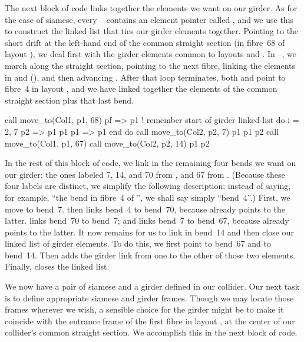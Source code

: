 The next block of code links together the elements we want on our girder. As for the case of siamese, every \PTC\  contains an element pointer called , and we use this to construct the linked list that ties our girder elements together. Pointing  to the short drift at the left-hand end of the common straight section (in fibre~68 of layout ), we deal first with the girder elements common to layouts  and . In --, we march along the straight section, pointing  to the next fibre, linking the elements in  and  (), and then advancing . After that loop terminates, both  and  point to fibre~4 in layout , and we have linked together the elements of the common straight section plus that last bend.
%
\begin{ptccode}
call move_to(Col1, p1, 68)
pf => p1  ! remember start of girder linked-list
do i = 2, 7                 \label{lin:blp.grdr}
  p2 => p1%
  p1%
  p1 => p1%
end do                      \label{lin:elp.grdr}
call move_to(Col2, p2,  7)
p1%
p1%
p2%
call move_to(Col1, p1, 67)
call move_to(Col2, p2, 14)
p1%
p2%
\end{ptccode}
%
In the rest of this block of code, we link in the remaining four
bends we want on our girder: the ones labeled 7, 14, and 70 from
, and 67 from . (Because these four labels are
distinct, we
simplify the following description: instead of saying, for example,
``the bend in fibre~4 of '', we shall say simply ``bend~4''.)
First, we move  to bend~7.  then links
bend~4 to bend~70, because  already points to
the latter.  links bend~70 to bend~7; and
 links bend~7 to bend~67, because 
already points to the latter. It now remains for us to link in
bend~14 and then close our linked list of girder elements. To do
this, we first point  to bend~67 and  to bend~14.
Then  adds the girder link from one to the other
of those two elements. Finally,  closes the linked
list.

We now have a pair of siamese and a girder defined in our collider.
Our next task is to define appropriate siamese and girder frames.
Though we may locate those frames wherever we wish, a sensible choice
for the girder might be to make it coincide with the entrance frame
of the first fibre in layout , at the center of our collider's
common straight section. We accomplish this in the next block of
code.

